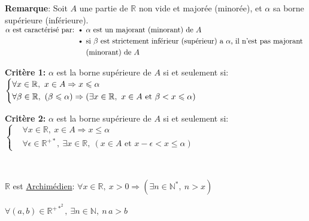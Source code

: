 \documentclass[12pt,twoside,a4paper]{article}
\begin{document}
			\begin{flushleft}
				\textbf{Remarque}: Soit $A$ une partie de $\mathbb{R}$ non vide et major\'ee (minor\'ee), et $\alpha$ sa borne sup\'erieure (inf\'erieure).\\
				$\begin{aligned}
					\alpha\text{ est caract\'eris\'e par: \textbullet\ }&\alpha \text{ est un majorant (minorant) de }A\\
						\text{\textbullet\ }&\text{si }\beta\text{ est strictement inf\'erieur (sup\'erieur) a }\alpha\text{, il n'est pas majorant }\\
						&\text{(minorant) de }A\end{aligned}$
				\begin{liste}
					\item \textbf{Crit\`ere 1:} $\alpha$ est la borne sup\'erieure de $A$ si et seulement si:\\
						$\left\{\begin{aligned}
							&\forall x\in\mathbb{R},\ x\in A\Rightarrow x\leqslant\alpha\\
							&\forall\beta\in\mathbb{R},\ (\beta\leqslant\alpha)\Rightarrow(\exists x\in\R,\ x\in A\text{ et }\beta<x\leqslant\alpha)
						\end{aligned} \right.$
					\item \textbf{Crit\`ere 2:} $\alpha$ est la borne sup\'erieure de $A$ si et seulement si:\\
						$\left\{\begin{aligned}
							&\forall x\in\mathbb{R},\ x\in A\Rightarrow x\leqslant\alpha\\
							&\forall\epsilon\in\mathbb{R}^{+*},\ \exists x\in\mathbb{R},\ (x\in A\text{ et }x-\epsilon<x\leqslant\alpha)
						\end{aligned} \right.$
				\end{liste}\ \\
			\end{flushleft}
			\begin{coro}
				$\mathbb{R}$ est \underline{Archim\'edien}: $\forall x\in\mathbb{R},\ x>0\Rightarrow(\exists n\in\mathbb{N}^*,\ n>x)$
			\end{coro}
			\begin{coro}
				$\forall(a,b)\in\mathbb{R}^{+*^2},\ \exists n\in\mathbb{N},\ n\,a>b$
			\end{coro}
\end{document}
